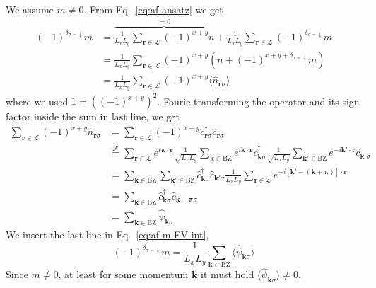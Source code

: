 \begin{tabproof}
	We assume $m \neq 0$. From Eq.~\eqref{eq:af-ansatz} we get
	\begin{align}
		(-1)^{\delta_{\sigma=\downarrow}} m &=  \overbrace{\frac{1}{L_x L_y} \sum_{\mathbf{r}\in\mathcal{L}} (-1)^{x+y} n}^{=0} + \frac{1}{L_x L_y} \sum_{\mathbf{r}\in\mathcal{L}} (-1)^{\delta_{\sigma=\downarrow}} m \nonumber \\
		&= \frac{1}{L_x L_y} \sum_{\mathbf{r}\in\mathcal{L}} (-1)^{x+y} \left(
		n + (-1)^{x+y+\delta_{\sigma=\downarrow}} m
		\right) \nonumber \\
		&= \frac{1}{L_x L_y} \sum_{\mathbf{r}\in\mathcal{L}} (-1)^{x+y} \langle \hat n_{\mathbf{r}\sigma} \rangle \label{eq:af-m-EV-int}
	\end{align}
	where we used $1 = \left((-1)^{x+y}\right)^2$. Fourie-transforming the operator and its sign factor inside the sum in last line, we get
	\begin{align}
		\sum_{\mathbf{r}\in\mathcal{L}} (-1)^{x+y} \hat n_{\mathbf{r}\sigma} &= \sum_{\mathbf{r}\in\mathcal{L}} (-1)^{x+y} \hat c_{\mathbf{r}\sigma}^\dagger \hat c_{\mathbf{r}\sigma} \nonumber \\
		&\stackrel{\mathcal{F}}{=} \sum_{\mathbf{r}\in\mathcal{L}} e^{i \bm{\pi} \cdot \mathbf{r}}
		\frac{1}{\sqrt{L_x L_y}} \sum_{\mathbf{k} \in \mathrm{BZ}} e^{i \mathbf{k} \cdot \mathbf{r}} \hat c_{\mathbf{k}\sigma}^\dagger \frac{1}{\sqrt{L_x L_y}} \sum_{\mathbf{k}' \in \mathrm{BZ}} e^{-i \mathbf{k}' \cdot \mathbf{r}} \hat c_{\mathbf{k}'\sigma} \nonumber \\
		&=\sum_{\mathbf{k} \in \mathrm{BZ}} \sum_{\mathbf{k}' \in \mathrm{BZ}} \hat c_{\mathbf{k}\sigma}^\dagger \hat c_{\mathbf{k}'\sigma} \frac{1}{L_x L_y} \sum_{\mathbf{r}\in\mathcal{L}} e^{-i [\mathbf{k}' - (\mathbf{k} + \bm{\pi}) ] \cdot \mathbf{r}} \nonumber \\
		&= \sum_{\mathbf{k} \in \mathrm{BZ}} \hat c_{\mathbf{k}\sigma}^\dagger \hat c_{\mathbf{k}+\bm{\pi}\sigma} \label{eq:af-<psi>-not0-int} \\
		&= \sum_{\mathbf{k} \in \mathrm{BZ}} \hat \psi_{\mathbf{k}\sigma} \label{eq:af-<psi>-not0}
	\end{align}
	We insert the last line in Eq.~\eqref{eq:af-m-EV-int},
	\begin{equation}\label{eq:af-m-EV}
		(-1)^{\delta_{\sigma=\downarrow}} m = \frac{1}{L_x L_y} \sum_{\mathbf{k} \in \mathrm{BZ}} \langle \hat \psi_{\mathbf{k}\sigma} \rangle
	\end{equation}
	Since $m \neq 0$, at least for some momentum $\mathbf{k}$ it must hold $\langle \hat \psi_{\mathbf{k}\sigma} \rangle \neq 0$.	
	
\end{tabproof}

